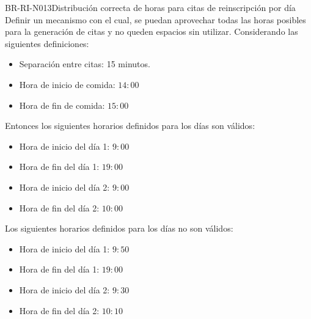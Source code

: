 \begin{BusinessRule}{BR-RI-N013}{Distribución correcta de horas para citas de reinscripción por día}
	\BRItem[Motivación] Definir un mecanismo con el cual, se puedan aprovechar todas las horas posibles para la generación de citas y no queden espacios sin utilizar.
	\BRItem[Ejemplo] Considerando las siguientes definiciones:
	\begin{itemize}
		\item Separación entre citas: 15 minutos.
		\item Hora de inicio de comida: $14:00$
		\item Hora de fin de comida: $15:00$
	\end{itemize}
	
	Entonces los siguientes horarios definidos para los días son válidos:	
	
	\begin{itemize}
		\item Hora de inicio del día 1: $9:00$
		\item Hora de fin del día 1: $19:00$
		\item Hora de inicio del día 2: $9:00$
		\item Hora de fin del día 2: $10:00$
	\end{itemize}
	
	Los siguientes horarios definidos para los días no son válidos:
	\begin{itemize}
		\item Hora de inicio del día 1: $9:50$
		\item Hora de fin del día 1: $19:00$
		\item Hora de inicio del día 2: $9:30$
		\item Hora de fin del día 2: $10:10$
	\end{itemize}
\end{BusinessRule}


